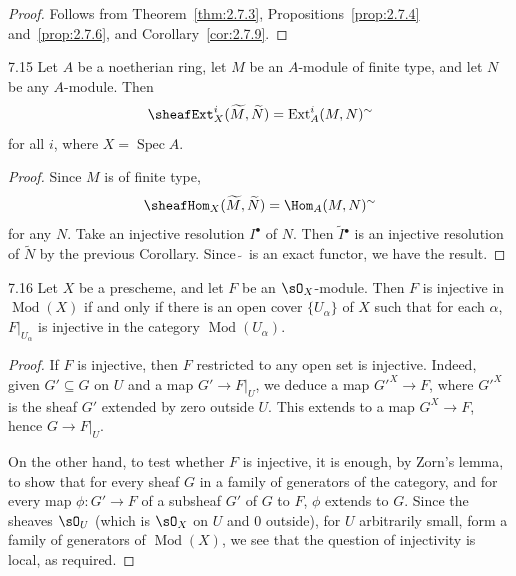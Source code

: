 \begin{proof}
Follows from Theorem~\ref{thm:2.7.3}, Propositions~\ref{prop:2.7.4} and~\ref{prop:2.7.6}, and Corollary~\ref{cor:2.7.9}.
\end{proof}

\begin{bookcorollary}{7.15}\label{cor:2.7.15}
Let $A$ be a noetherian ring, let $M$ be an $A$-module of finite type, and let $N$ be any $A$-module. Then
\[
\sheafExt_X^i(\widetilde{M},\widetilde{N}) = \operatorname{Ext}_A^i(M,N)^{\sim}
\]
for all $i$, where $X=\operatorname{Spec}A$.
\end{bookcorollary}

\begin{proof}
Since $M$ is of finite type,
\[
\sheafHom_X(\widetilde{M},\widetilde{N}) = \Hom_A(M,N)^{\sim}
\]
for any $N$. Take an injective resolution $I^\bullet$ of $N$. Then $\widetilde{I}{}^\bullet$ is an injective resolution of $\widetilde{N}$ by the previous Corollary. Since $\widetilde{\;}$ is an exact functor, we have the result.
\end{proof}

\begin{booklemma}{7.16}\label{lem:2.7.16}
Let $X$ be a prescheme, and let $F$ be an $\sO_X$-module. Then $F$ is injective in $\operatorname{Mod}(X)$ if and only if there is an open cover $\{U_\alpha\}$ of $X$ such that for each $\alpha$, $F|_{U_\alpha}$ is injective in the category $\operatorname{Mod}(U_\alpha)$.
\end{booklemma}

\begin{proof}
If $F$ is injective, then $F$ restricted to any open set is injective. Indeed, given $G'\subseteq G$ on $U$ and a map $G'\to F|_U$, we deduce a map $G'^X\to F$, where $G'^X$ is the sheaf $G'$ extended by zero outside $U$. This extends to a map $G^X\to F$, hence $G\to F|_U$.

On the other hand, to test whether $F$ is injective, it is enough, by Zorn's lemma, to show that for every sheaf $G$ in a family of generators of the category, and for every map $\phi\colon G'\to F$ of a subsheaf $G'$ of $G$ to $F$, $\phi$ extends to $G$. Since the sheaves $\sO_U$ (which is $\sO_X$ on $U$ and $0$ outside), for $U$ arbitrarily small, form a family of generators of $\operatorname{Mod}(X)$, we see that the question of injectivity is local, as required.
\end{proof}

